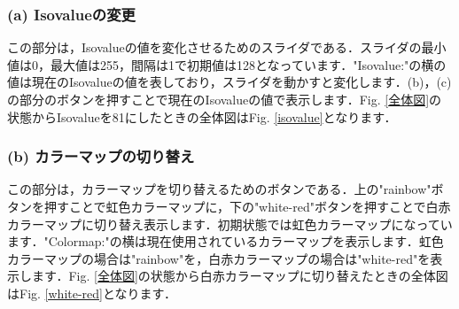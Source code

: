 ﻿\documentclass[a4paper,10pt,fleqn]{jarticle}
\begin{document}
\subsubsection*{(a) Isovalueの変更}
この部分は，Isovalueの値を変化させるためのスライダである．スライダの最小値は0，最大値は255，間隔は1で初期値は128となっています．"Isovalue:"の横の値は現在のIsovalueの値を表しており，スライダを動かすと変化します．(b)，(c)の部分のボタンを押すことで現在のIsovalueの値で表示します．Fig. \ref{全体図}の状態からIsovalueを81にしたときの全体図はFig. \ref{isovalue}となります．
\subsubsection*{(b) カラーマップの切り替え}
この部分は，カラーマップを切り替えるためのボタンである．上の"rainbow"ボタンを押すことで虹色カラーマップに，下の"white-red"ボタンを押すことで白赤カラーマップに切り替え表示します．初期状態では虹色カラーマップになっています．"Colormap:"の横は現在使用されているカラーマップを表示します．虹色カラーマップの場合は"rainbow"を，白赤カラーマップの場合は"white-red"を表示します．Fig. \ref{全体図}の状態から白赤カラーマップに切り替えたときの全体図はFig. \ref{white-red}となります．
\end{document}
